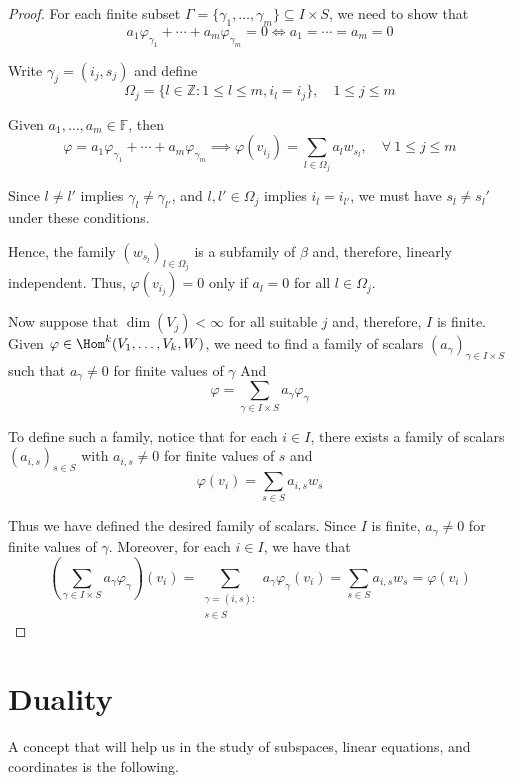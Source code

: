 \begin{proof}
  For each finite subset $\Gamma = \{\gamma_1, \ldots, \gamma_m \} \subseteq I \times S$, we need to show that 
  \[
    a_1 \varphi_{\gamma_1} + \cdots + a_m \varphi_{\gamma_m} = 0 \iff a_1 = \cdots = a_m = 0
  \]

  Write $\gamma_j = (i_j, s_j)$ and define 
  \[
    \Omega_j = \{ l \in \mathbb{Z} : 1 \leq l \leq m, i_l = i_j \}, \quad 1 \leq j \leq m
  \]

  Given $ a_1, \ldots, a_m \in \mathbb{F}$, then 
  \[
    \varphi = a_1 \varphi_{\gamma_1} + \cdots + a_m \varphi_{\gamma_m} \implies \varphi(v_{i_j}) = \sum_{l \in \Omega_j} a_l w_{s_l}, \quad \forall~1 \leq j \leq m
  \]

  Since $l \neq l'$ implies $\gamma_l \neq \gamma_{l'}$, and $l, l' \in \Omega_j$ implies $i_l = i_{l'}$, we must have $s_l \neq s_l'$ under these conditions. 

  Hence, the family $(w_{s_l})_{l \in \Omega_j}$ is a subfamily of $\beta$ and, therefore, linearly independent. Thus, $\varphi(v_{i_j}) = 0$ only if $a_l = 0$ for all $l \in \Omega_j$.

  Now suppose that $\dim(V_j) < \infty$ for all suitable $j$ and, therefore, $I$ is finite. Given $\varphi \in \Hom^k(V_1, \ldots, V_k, W)$, we need to find a family of scalars $(a_\gamma)_{\gamma \in I \times S}$ such that $a_\gamma \neq 0$ for finite values of $\gamma$ And
  \[
    \varphi = \sum_{\gamma \in I \times S} a_\gamma \varphi_\gamma
  \]

  To define such a family, notice that for each $i \in I$, there exists a family of scalars $(a_{i,s})_{s \in S}$ with $a_{i, s} \neq 0$ for finite values of $s$ and 
  \[
    \varphi(v_i) = \sum_{s \in S} a_{i,s} w_s
  \]

  Thus we have defined the desired family of scalars. Since $I$ is finite, $a_\gamma \neq 0$ for finite values of $\gamma$. Moreover, for each $i \in I$, we have that 
  \[
    \left( \sum_{\gamma \in I \times S} a_\gamma \varphi_\gamma \right) (v_i) = \sum_{\substack{\gamma=(i,s) : \\ s \in S}} a_\gamma \varphi_\gamma(v_i) = \sum_{s \in S} a_{i,s} w_s = \varphi(v_i)
  \]
\end{proof}

\section{Duality}

A concept that will help us in the study of subspaces, linear equations, and coordinates is the following.

